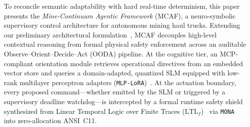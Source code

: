 \documentclass{ieeeaccess}
\begin{document}
To reconcile semantic adaptability with hard real-time determinism, this paper presents the \emph{Mine-Continuum Agentic Framework} (MCAF), a neuro-symbolic supervisory control architecture for autonomous mining haul trucks. Extending our preliminary architectural formulation~\cite{andrade2026mcaf}, MCAF decouples high-level contextual reasoning from formal physical safety enforcement across an auditable Observe--Orient--Decide--Act (OODA) pipeline. At the cognitive tier, an MCP-compliant orientation module retrieves operational directives from an embedded vector store and queries a domain-adapted, quantized SLM equipped with low-rank multilayer perceptron adapters (\texttt{MLP-LoRA})~\cite{hu2022lora}. At the actuation boundary, every proposed command---whether emitted by the SLM or triggered by a supervisory deadline watchdog---is intercepted by a formal runtime safety shield~\cite{alshiekh2018shield} synthesized from Linear Temporal Logic over Finite Traces ($\mathrm{LTL}_f$)~\cite{degiacomo2013ltlf} via \texttt{MONA}~\cite{klarlund2001mona} into zero-allocation ANSI~C11.
\end{document}
